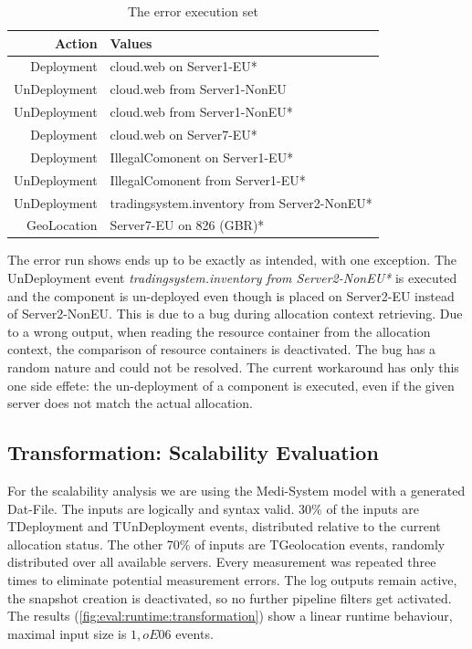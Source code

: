 \begin{table}[h]
	\centering
	\begin{tabular}{r | l}
		\hline
		\textbf{Action} & \textbf{Values}\\
		\hline
		Deployment & cloud.web on Server1-EU*\\
		UnDeployment & cloud.web from Server1-NonEU\\
		UnDeployment & cloud.web from Server1-NonEU*\\
		Deployment & cloud.web on Server7-EU*\\
		Deployment & IllegalComonent on Server1-EU*\\
		UnDeployment & IllegalComonent from Server1-EU*\\
		UnDeployment & tradingsystem.inventory from Server2-NonEU*\\
		GeoLocation & Server7-EU on 826 (GBR)*\\
		\hline
	\end{tabular}
	\caption{The error execution set}
	\label{tab:error_run}
\end{table}

The error run shows ends up to be exactly as intended, with one exception. The UnDeployment event \textit{tradingsystem.inventory from Server2-NonEU*} is executed and the component is un-deployed even though is placed on Server2-EU instead of Server2-NonEU. This is due to a bug during allocation context retrieving. Due to a wrong output, when reading the resource container from the allocation context, the comparison of resource containers is deactivated. The bug has a random nature and could not be resolved. The current workaround has only this one side effete: the un-deployment of a component is executed, even if the given server does not match the actual allocation.


\subsection{Transformation: Scalability Evaluation}

For the scalability analysis we are using the Medi-System model with a generated Dat-File. The inputs are logically and syntax valid. 30\% of the inputs are TDeployment and TUnDeployment events, distributed relative to the current allocation status. The other 70\% of inputs are TGeolocation events, randomly distributed over all available servers. Every measurement was repeated three times to eliminate potential measurement errors. The log outputs remain active, the snapshot creation is deactivated, so no further pipeline filters get activated. The results (\autoref{fig:eval:runtime:transformation}) show a linear runtime behaviour, maximal input size is $1,oE06$ events.

